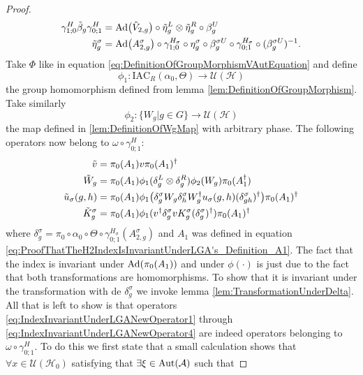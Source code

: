 \documentclass[12pt,a4paper,twoside]{article}
\newcommand{\IAC}{\textrm{IAC}}
\let\originalleft\left
\let\originalright\right
\renewcommand{\left}{\mathopen{}\mathclose\bgroup\originalleft}
\renewcommand{\right}{\aftergroup\egroup\originalright}
\newcommand{\UU}{\mathcal U}
\newcommand{\HH}{\mathcal H}
\renewcommand{\AA}{\mathcal A}
\newcommand{\Ad}[1]{\textrm{Ad}\left(#1\right)}
\newcommand{\Aut}[1]{\textrm{Aut}\left(#1\right)}
\theoremstyle{definition}
\numberwithin{equation}{section}
\begin{document}
\begin{proof}
	\begin{align}
		\label{eq:IndexInvariantUnderLGAEtaTildeDefiniton1}
		\gamma^{H}_{1;0}\tilde{\beta}_g\gamma^{H}_{0;1}&=\Ad{\tilde V_{2,g}}\circ\tilde{\eta}_g^L\otimes\tilde{\eta}_g^R\circ\beta_g^U\\
		\label{eq:IndexInvariantUnderLGAEtaTildeDefiniton2}
		\tilde{\eta}_g^\sigma&=\Ad{A_{2,g}^\sigma}\circ\gamma^{H_\sigma}_{1;0}\circ\eta_g^\sigma\circ\beta_g^{\sigma U}\circ\gamma^{H_\sigma}_{0;1}\circ(\beta_g^{\sigma U})^{-1}.
	\end{align}
	Take $\Phi$ like in equation \eqref{eq:DefinitionOfGroupMorphismVAutEquation} and define
	\begin{equation}
		\phi_1:\IAC_R(\alpha_0,\Theta) \rightarrow \UU(\HH)
	\end{equation}
	the group homomorphism defined from lemma \ref{lem:DefinitionOfGroupMorphism}. Take similarly
	\begin{equation}
		\phi_2:\{W_g|g\in G\}\rightarrow \UU(\HH)
	\end{equation}
	the map defined in \ref{lem:DefinitionOfWgMap} with arbitrary phase. The following operators now belong to $\omega\circ\gamma^{H}_{0;1}:$
	\begin{align}
		\label{eq:IndexInvariantUnderLGANewOperator1}
		\tilde{v}&=\pi_0(A_1)v\pi_0(A_1)^\dagger\\
		\label{eq:IndexInvariantUnderLGANewOperator2}
		\tilde{W}_g&=\pi_0(A_1)\phi_1(\delta^L_g\otimes\delta^R_g)\phi_2( W_g)\pi_0(A_1^\dagger)\\
		\label{eq:IndexInvariantUnderLGANewOperator3}
		\tilde u_\sigma(g,h)&=\pi_0(A_1) \phi_1\left(\delta^\sigma_g W_g\delta^\sigma_h W_g^\dagger u_\sigma(g,h)(\delta^\sigma_{gh})^\dagger\right)\pi_0(A_1)^\dagger\\
		\label{eq:IndexInvariantUnderLGANewOperator4}
		\tilde{K}_g^\sigma&=\pi_0(A_1)\phi_1(v^\dagger \delta_g^\sigma v K_g^\sigma (\delta_g^\sigma)^\dagger) \pi_0(A_1)^\dagger
	\end{align}
	where $\delta^\sigma_g=\pi_0\circ\alpha_0\circ\Theta\circ\gamma^{H_\sigma}_{0;1}(A^\sigma_{2,g})$ and $A_1$ was defined in equation \eqref{eq:ProofThatTheH2IndexIsInvariantUnderLGA's_Definition_A1}. The fact that the index is invariant under $\Ad{\pi_0(A_1)}$ and under $\phi(\cdot)$ is just due to the fact that both transformations are homomorphisms. To show that it is invariant under the transformation with de $\delta^\sigma_g$ we invoke lemma \ref{lem:TransformationUnderDelta}. All that is left to show is that operators \eqref{eq:IndexInvariantUnderLGANewOperator1} through \eqref{eq:IndexInvariantUnderLGANewOperator4} are indeed operators belonging to $\omega\circ\gamma^{H}_{0;1}$. To do this we first state that a small calculation shows that $\forall x\in\UU(\HH_0)$ satisfying that $\exists\xi\in\Aut{\AA}$ such that

\end{proof}
\end{document}
